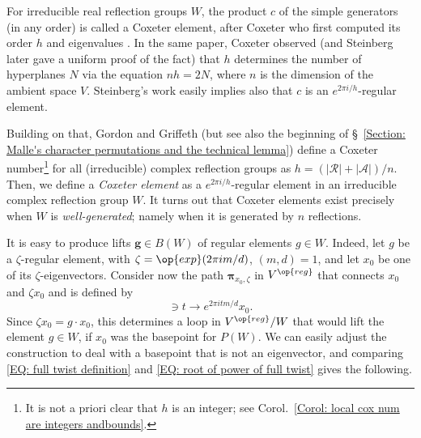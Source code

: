 For irreducible real reflection groups $W$, the product $c$ of the simple generators (in any order) is called a Coxeter element, after Coxeter who first computed its order $h$ and eigenvalues \cite{coxeter-duke}. In the same paper, Coxeter observed (and Steinberg later \cite{steinberg-finite-reflection-groups} gave a uniform proof of the fact) that $h$ determines the number of hyperplanes $N$ via the equation $nh=2N$, where $n$ is the dimension of the ambient space $V$. Steinberg's work easily implies also that $c$ is an $e^{2\pi i/h}$-regular element.

Building on that, Gordon and Griffeth (but see also the beginning of \S~\ref{Section: Malle's character permutations and the technical lemma}) define a Coxeter number\footnote{It is not a priori clear that $h$ is an integer; see Corol.~\ref{Corol: local cox num are integers andbounds}.} for all (irreducible) complex reflection groups as $h=(|\mathcal{R}|+|\mathcal{A}|)/n$. Then, we define a {\it \color{blue} Coxeter element} as a $e^{2\pi i/h}$-regular element in an irreducible complex reflection group $W$. It turns out that Coxeter elements exist precisely when $W$ is {\it \color{blue} well-generated}; namely when it is generated by $n$ reflections. 

It is easy to produce lifts $\bm g\in B(W)$ of regular elements $g\in W$. Indeed, let $g$ be a $\zeta$-regular element, with $\zeta=\op{exp}(2\pi i m/d)$, $(m,d)=1$, and let $x_0$ be one of its $\zeta$-eigenvectors. Consider now the path $\bm \pi_{x_0,\zeta}$ in $V^{\op{reg}}$ that connects $x_0$ and $\zeta x_0$ and is defined by \begin{equation}[0,1]\ni t\rightarrow e^{2\pi i tm/d}x_0.\label{EQ: root of power of full twist}\end{equation}
Since $\zeta x_0=g\cdot x_0$, this determines a loop in $V^{\op{reg}}/W$ that would lift the element $g\in W$, if $x_0$ was the basepoint for $P(W)$. We can easily adjust the construction to deal with a basepoint that is not an eigenvector, and comparing \eqref{EQ: full twist definition} and \eqref{EQ: root of power of full twist} gives the following.

